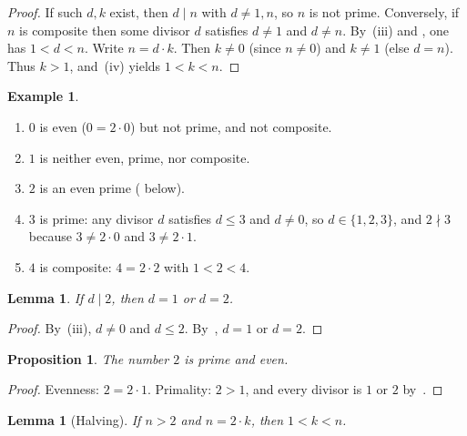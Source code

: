 \documentclass[11pt,reqno]{amsart}
\theoremstyle{plain}
\newtheorem{lemma}[theorem]{Lemma}
\newtheorem{proposition}[theorem]{Proposition}
\theoremstyle{definition}
\newtheorem{example}[theorem]{Example}
\theoremstyle{remark}
\numberwithin{equation}{section}
\begin{document}
\begin{proof}
If such \(d,k\) exist, then \(d\mid n\) with \(d\neq 1,n\), so \(n\) is
not prime. Conversely, if \(n\) is composite then some divisor \(d\)
satisfies \(d\neq 1\) and \(d\neq n\). By~(iii) and
, one has \(1<d<n\). Write \(n=d\cdot k\). Then
\(k\neq 0\) (since \(n\neq 0\)) and \(k\neq 1\) (else \(d=n\)). Thus
\(k>1\), and~(iv) yields \(1<k<n\).
\end{proof}

\begin{example}
\label{ex:small}
\begin{enumerate}[label=(\alph*)]
  \item \(0\) is even (\(0=2\cdot 0\)) but not prime, and not composite.
  \item \(1\) is neither even, prime, nor composite.
  \item \(2\) is an even prime ( below).
  \item \(3\) is prime: any divisor \(d\) satisfies \(d\le 3\) and
        \(d\neq 0\), so \(d\in\{1,2,3\}\), and \(2\nmid 3\) because
        \(3\neq 2\cdot 0\) and \(3\neq 2\cdot 1\).
  \item \(4\) is composite: \(4=2\cdot 2\) with \(1<2<4\).
\end{enumerate}
\end{example}

\begin{lemma}
\label{lem:divisors-of-two}
If \(d\mid 2\), then \(d=1\) or \(d=2\).
\end{lemma}

\begin{proof}
By~(iii), \(d\neq 0\) and \(d\le 2\).
By~, \(d=1\) or \(d=2\).
\end{proof}

\begin{proposition}
\label{prop:two}
The number \(2\) is prime and even.
\end{proposition}

\begin{proof}
Evenness: \(2=2\cdot 1\). Primality: \(2>1\), and every divisor is
\(1\) or \(2\) by~.
\end{proof}

\begin{lemma}[Halving]
\label{lem:halve}
If \(n>2\) and \(n=2\cdot k\), then \(1<k<n\).
\end{lemma}
\end{document}
